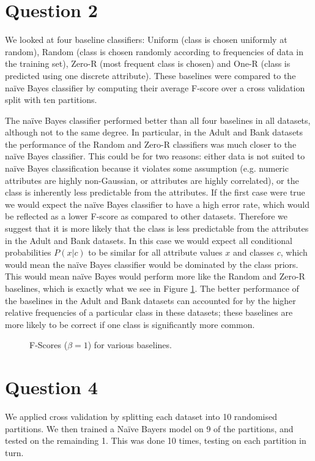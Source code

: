 \documentclass[11pt]{article}
\begin{document}
    \pagebreak
    \section*{Question 2}
    We looked at four baseline classifiers: Uniform (class is chosen uniformly at random), Random (class is chosen randomly according to frequencies of data in the training set), Zero-R (most frequent class is chosen) and One-R (class is predicted using one discrete attribute). These baselines were compared to the na\"{i}ve Bayes classifier by computing their average F-score over a cross validation split with ten partitions. 

    The na\"{i}ve Bayes classifier performed better than all four baselines in all datasets, although not to the same degree. In particular, in the Adult and Bank datasets the performance of the Random and Zero-R classifiers was much closer to the na\"{i}ve Bayes classifier. This could be for two reasons: either data is not suited to na\"{i}ve Bayes classification because it violates some assumption (e.g. numeric attributes are highly non-Gaussian, or attributes are highly correlated), or the class is inherently less predictable from the attributes. If the first case were true we would expect the na\"{i}ve Bayes classifier to have a high error rate, which would be reflected as a lower F-score as compared to other datasets. Therefore we suggest that it is more likely that the class is less predictable from the attributes in the Adult and Bank datasets. In this case we would expect all conditional probabilities $P(x|c)$ to be similar for all attribute values $x$ and classes $c$, which would mean the na\"{i}ve Bayes classifier would be dominated by the class priors. This would mean na\"{i}ve Bayes would perform more like the Random and Zero-R baselines, which is exactly what we see in Figure \ref{fig:q2-baseline-fscores}. The better performance of the baselines in the Adult and Bank datasets can accounted for by the higher relative frequencies of a particular class in these datasets; these baselines are more likely to be correct if one class is significantly more common.


    \begin{figure}[H]
        \centering
        \def\svgwidth{\columnwidth}
        \fbox{\scalebox{0.8}{}}
        \caption{F-Scores ($\beta = 1$) for various baselines.}
        \label{fig:q2-baseline-fscores}
    \end{figure}

    \pagebreak
    \section*{Question 4}
    We applied cross validation by splitting each dataset into 10 randomised partitions. We then trained a Na\"{i}ve Bayers model on 9 of the partitions, and tested on the remainding 1. This was done 10 times, testing on each partition in turn.
\end{document}
